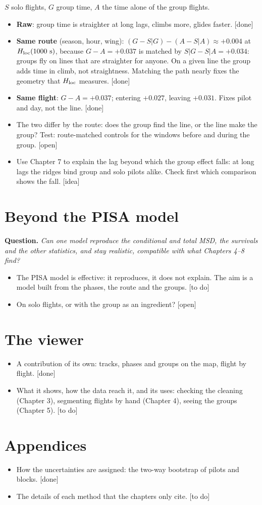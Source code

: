 \documentclass[11pt]{article}
\newcommand{\done}{\textcolor{green!45!black}{\textsf{[done]}}}
\newcommand{\todo}{\textcolor{orange!85!black}{\textsf{[to do]}}}
\newcommand{\idea}{\textcolor{blue!70!black}{\textsf{[idea]}}}
\newcommand{\open}{\textcolor{red!70!black}{\textsf{[open]}}}
\newcommand{\Q}[1]{\noindent\textbf{Question.} \emph{#1}\par\smallskip}
\begin{document}
\noindent $S$ solo flights, $G$ group time, $A$ the time alone of the group flights.
\begin{itemize}
  \item \textbf{Raw}: group time is straighter at long lags, climbs more, glides faster. \done
  \item \textbf{Same route} (season, hour, wing): $(G-S|G)-(A-S|A)\approx+0.004$ at
        $H_{\rm loc}(1000~{\rm s})$, because $G-A=+0.037$ is matched by $S|G-S|A=+0.034$: groups fly on
        lines that are straighter for anyone. On a given line the group adds time in climb, not
        straightness. Matching the path nearly fixes the geometry that $H_{\rm loc}$ measures. \done
  \item \textbf{Same flight}: $G-A=+0.037$; entering $+0.027$, leaving $+0.031$. Fixes pilot and day,
        not the line. \done
  \item The two differ by the route: does the group find the line, or the line make the group?
        Test: route-matched controls for the windows before and during the group. \open
  \item Use Chapter 7 to explain the lag beyond which the group effect falls: at long lags the
        ridges bind group and solo pilots alike. Check first which comparison shows the fall. \idea
\end{itemize}

\section{Beyond the PISA model}

\Q{Can one model reproduce the conditional and total MSD, the survivals and the other statistics,
and stay realistic, compatible with what Chapters 4--8 find?}
\begin{itemize}
  \item The PISA model is effective: it reproduces, it does not explain. The aim is a model built
        from the phases, the route and the groups. \todo
  \item On solo flights, or with the group as an ingredient? \open
\end{itemize}

\section{The viewer}

\begin{itemize}
  \item A contribution of its own: tracks, phases and groups on the map, flight by flight. \done
  \item What it shows, how the data reach it, and its uses: checking the cleaning (Chapter 3),
        segmenting flights by hand (Chapter 4), seeing the groups (Chapter 5). \todo
\end{itemize}

\section*{Appendices}
\begin{itemize}
  \item How the uncertainties are assigned: the two-way bootstrap of pilots and blocks. \done
  \item The details of each method that the chapters only cite. \todo
\end{itemize}
\end{document}
